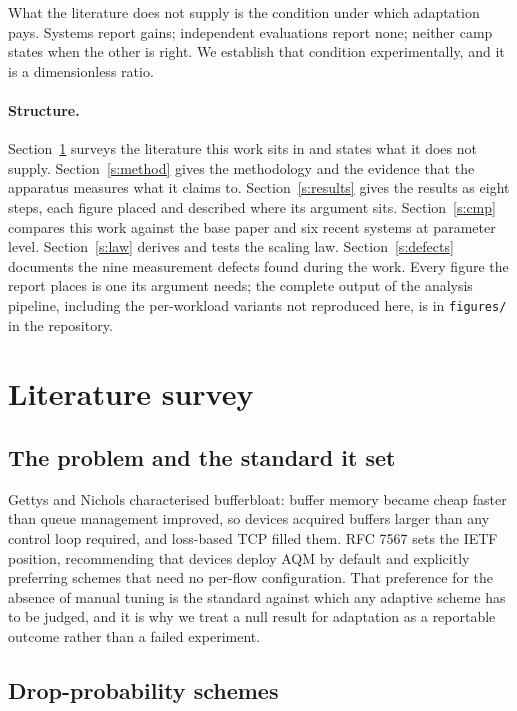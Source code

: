 \documentclass[11pt,a4paper]{article}
\begin{document}
What the literature does not supply is the condition under which adaptation
pays. Systems report gains; independent evaluations report none; neither camp
states when the other is right. We establish that condition experimentally,
and it is a dimensionless ratio.

\paragraph{Structure.} Section~\ref{s:lit} surveys the literature this
work sits in and states what it does not supply. Section~\ref{s:method} gives
the methodology and the
evidence that the apparatus measures what it claims to.
Section~\ref{s:results} gives the results as eight steps, each figure placed
and described where its argument sits. Section~\ref{s:cmp} compares this work
against the base paper and six recent systems at parameter level.
Section~\ref{s:law} derives and tests the scaling law.
Section~\ref{s:defects} documents the nine measurement defects found during
the work. Every figure the report places is one its argument needs; the
complete output of the analysis pipeline, including the per-workload variants
not reproduced here, is in \texttt{figures/} in the repository.

\section{Literature survey}\label{s:lit}

\subsection{The problem and the standard it set}

Gettys and Nichols characterised bufferbloat: buffer memory became cheap
faster than queue management improved, so devices acquired buffers larger than
any control loop required, and loss-based TCP filled them\cite{gettys2012}.
RFC 7567 sets the IETF position, recommending that devices deploy AQM by
default and explicitly preferring schemes that need no per-flow
configuration\cite{rfc7567}. That preference for the absence of manual tuning
is the standard against which any adaptive scheme has to be judged, and it is
why we treat a null result for adaptation as a reportable outcome rather
than a failed experiment.

\subsection{Drop-probability schemes}
\end{document}
